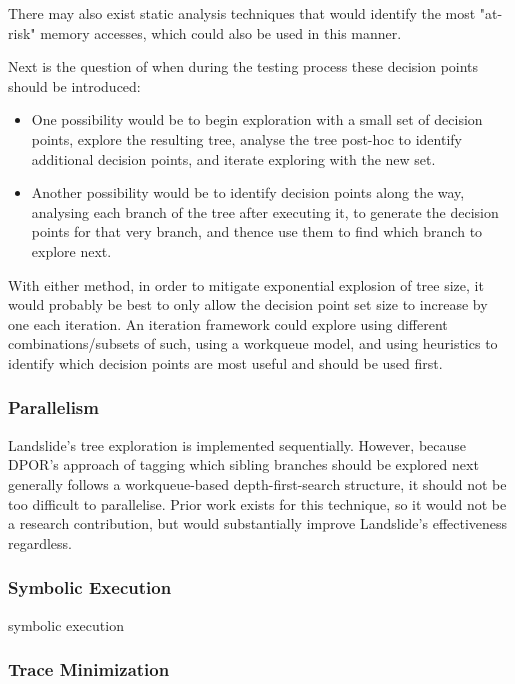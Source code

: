 There may also exist static analysis techniques that would identify the most "at-risk" memory accesses, which could also be used in this manner.

Next is the question of when during the testing process these decision points should be introduced:

\begin{itemize}
	\item One possibility would be to begin exploration with a small set of decision points, explore the resulting tree, analyse the tree post-hoc to identify additional decision points, and iterate exploring with the new set.
	\item Another possibility would be to identify decision points along the way, analysing each branch of the tree after executing it, to generate the decision points for that very branch, and thence use them to find which branch to explore next.
\end{itemize}

With either method, in order to mitigate exponential explosion of tree size, it would probably be best to only allow the decision point set size to increase by one each iteration. An iteration framework could explore using different combinations/subsets of such, using a workqueue model, and using heuristics to identify which decision points are most useful and should be used first.

\subsubsection{Parallelism}

Landslide's tree exploration is implemented sequentially. However, because DPOR's approach of tagging which sibling branches should be explored next generally follows a workqueue-based depth-first-search structure, it should not be too difficult to parallelise. Prior work exists for this technique\cite{distributed-dpor}, so it would not be a research contribution, but would substantially improve Landslide's effectiveness regardless.

\subsubsection{Symbolic Execution}
symbolic execution\cite{klee,dawson}

\subsubsection{Trace Minimization}

